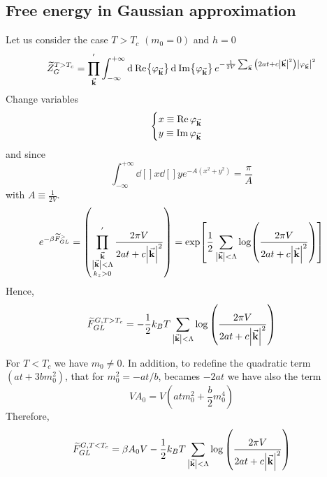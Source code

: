 \documentclass[../main/main.tex]{subfiles}
\begin{document}
\subsection{Free energy in Gaussian approximation}
Let us consider the case \( T>T_c \) \( (m_0=0) \) and \( h=0 \)
\begin{equation}
  \widetilde{Z}_G^{T>T_c} = \prod_{\va{k}}^{'} \int_{-\infty }^{+\infty } \dd[]{\Re {\varphi _{\va{k}}}}  \dd[]{\Im {\varphi _{\va{k}}}} e^{- \frac{1}{2V} \sum_{\va{k}}^{} \qty(2at+c \abs{\va{k}}^2 ) \abs{\varphi _{\va{k}}}^2}
\end{equation}
Change variables
\begin{equation}
  \begin{cases}
   x \equiv  \Re \varphi _{\va{k}}\\
  y \equiv  \Im \varphi _{\va{k}}
  \end{cases}
\end{equation}
and since
\begin{equation}
  \int_{-\infty }^{+\infty } \dd[]{x} \dd[]{y} e^{-A (x^2+y^2)} = \frac{\pi }{A}
\end{equation}
with \( A \equiv  \frac{1}{2V} \).
\begin{equation}
  e^{-\beta \widetilde{F}_{GL}^> } = \qty(\prod_{\substack{\va{k} \\ \abs{\va{k}} <\Lambda \\ k_z > 0  } }^{'}  \frac{2 \pi V}{2 a t + c \abs{\va{k}}^2 } )
  = \exp [\frac{1}{2} \sum_{\abs{\va{k}}<\Lambda  }^{} \log (\frac{2 \pi V}{2 a t + c \abs{\va{k}}^2 })   ]
\end{equation}
Hence,
\begin{equation}
  \widetilde{F}_{GL}^{G,T>T_c} = - \frac{1}{2} k_B T \sum_{\abs{\va{k}}< \Lambda  }^{}
  \log{\qty(\frac{2 \pi V}{2 a t + c \abs{\va{k}}^2 })}
\end{equation}
\begin{remark}
For \( T<T_c \) we have \( m_0 \neq 0 \). In addition, to redefine the quadratic term \( (at+3bm_0^2) \), that for \( m_0^2 = - at/b \), becames \( -2at \) we have also the term
\begin{equation}
  V A_0 = V (atm_0^2 + \frac{b}{2} m_0^4)
\end{equation}
Therefore,
\begin{equation}
  \widetilde{F}_{GL}^{G,T<T_c} = \beta A_0 V - \frac{1}{2} k_B T \sum_{\abs{\va{k}}< \Lambda  }^{}
  \log{\qty(\frac{2 \pi V}{2 a t + c \abs{\va{k}}^2 })}
\end{equation}
\end{remark}
\end{document}
